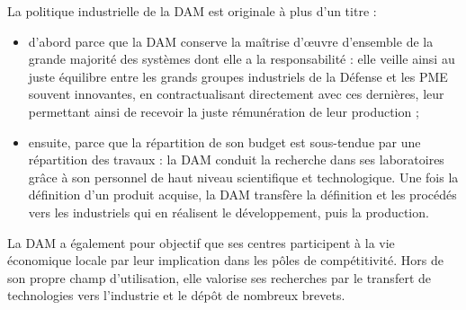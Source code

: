 \documentclass[12pt,a4paper,twoside]{article}
\begin{document}
    La politique industrielle de la DAM est originale à plus d'un titre :

    \begin{itemize}[label=\textbullet]
        \item
        d'abord parce que la DAM conserve la maîtrise d'\oe uvre
        d'ensemble de la grande majorité des systèmes dont elle a la
        responsabilité : elle veille ainsi au juste équilibre entre les
        grands groupes industriels de la Défense et les PME souvent
        innovantes, en contractualisant directement avec ces dernières,
        leur permettant ainsi de recevoir la juste rémunération de leur
        production ;
        \item
        ensuite, parce que la répartition de son budget est sous-tendue
        par une répartition des travaux : la DAM conduit la recherche
        dans ses laboratoires grâce à son personnel de haut niveau
        scientifique et technologique. Une fois la définition d'un
        produit acquise, la DAM transfère la définition et les procédés
        vers les industriels qui en réalisent le développement, puis la
        production.
    \end{itemize}

    La DAM a également pour objectif que ses centres participent à la vie économique
    locale par leur implication dans les pôles de compétitivité. Hors de son propre
    champ d'utilisation, elle valorise ses recherches par le transfert de
    technologies vers l'industrie et le dépôt de nombreux brevets.
\end{document}
